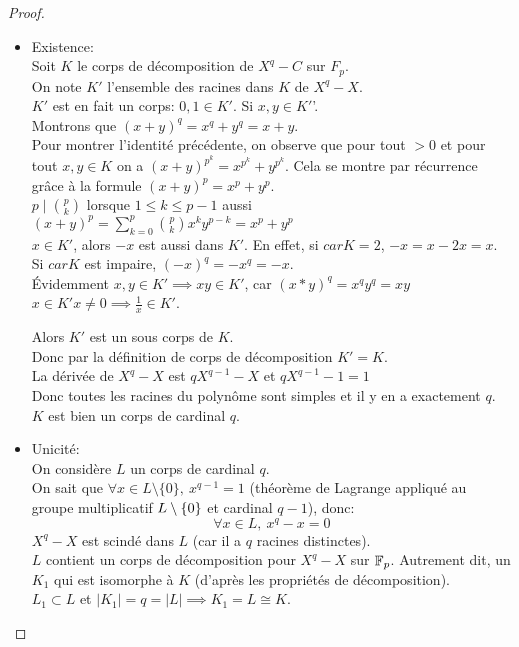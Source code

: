 \begin{proof}
	\begin{itemize}
		\item Existence:\\
		      Soit $K$ le corps de décomposition de $X^q-C$ sur $F_p$. \\
		      On note $K'$ l'ensemble des racines dans $K$ de $X^q-X$. \\
		      $K'$ est en fait un corps: $0, 1 \in K'$. Si $x, y \in K'$'.\\
		      Montrons que $(x+y)^q = x^q + y^q = x+ y$.\\
		      Pour montrer l'identité précédente, on observe que pour tout $>0$ et pour tout $x,y \in K$ on a
		      $(x+y)^{p^k}= x^{p^k} + y^{p^k}$. Cela se montre par récurrence grâce à la formule $(x+y)^p= x^p + y^p$.\\
		      $p \mid \binom{p}{k}$ lorsque $1 \leq k \leq p-1$ aussi $(x+y)^p = \sum^p_{k=0} \binom{p}{k} x^k y^{p-k} = x^p + y^p$\\

		      $x\in K'$, alors $-x$ est aussi dans $K'$.
		      En effet, si $car K = 2$, $-x = x -2x = x$. \\
		      Si $car K$ est impaire, $(-x)^q = -x^q = -x$. \\
		      Évidemment $x,y \in K' \implies xy \in K'$, car $(x*y)^q = x^qy^q = xy$\\
		      $x\in K' x \neq 0 \implies \frac{1}{x} \in K'$.

		      Alors $K'$ est un sous corps de $K$.\\
		      Donc par la définition de corps de décomposition $K' = K$.\\

		      La dérivée de $X^q-X$ est $qX^{q-1} - X$ et $qX^{q-1} - 1 = 1$\\
		      Donc toutes les racines du polynôme sont simples et il y en a exactement $q$. $K$ est bien un corps de cardinal $q$.

		\item Unicité:\\
		      On considère $L$ un corps de cardinal $q$.\\
		      On sait que $\forall x \in L \setminus \{0\},\  x^{q-1} = 1$ (théorème de Lagrange appliqué au groupe multiplicatif $L\setminus \left\{0\right\}$ et
		      cardinal $q-1$), donc:
		      $$\forall x \in L, \ x^q -x = 0$$
		      $X^q-X$ est scindé dans $L$ (car il a $q$ racines distinctes).\\
		      $L$ contient un corps de décomposition pour $X^q-X$ sur $\mathbb{F}_p$. Autrement dit, un $K_1$ qui est
		      isomorphe à $K$ (d'après les propriétés de décomposition).\\
		      $L_1 \subset L$ et $|K_1| = q = |L| \implies K_1 = L \cong K$.
	\end{itemize}
\end{proof}

